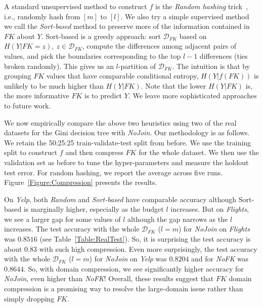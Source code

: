 \documentclass{vldb}
\begin{document}
A standard unsupervised method to construct $f$ is the \textit{Random hashing} trick~\cite{hashingtrick}, i.e., randomly hash from $[m]$ to $[l]$.
We also try a simple supervised method we call the \textit{Sort-based} method to preserve more of the information contained 
in $FK$ about $Y$. Sort-based is a greedy approach: sort $\mathcal{D}_{FK}$ based on $H(Y|FK=z), ~z \in \mathcal{D}_{FK}$, compute the 
differences among adjacent pairs of values, and pick the boundaries corresponding to the top $l-1$ differences (ties broken randomly). 
This gives us an $l$-partition of $\mathcal{D}_{FK}$. The intuition is that by grouping $FK$ values that have comparable conditional entropy, 
$H(Y|f(FK))$ is unlikely to be much higher than $H(Y|FK)$. Note that the lower $H(Y|FK)$ is, the more informative $FK$ is to predict $Y$. 
We leave more sophisticated approaches to future work.

We now empirically compare the above two heuristics using two of the real datasets for the Gini decision tree with \textit{NoJoin}. Our methodology 
is as follows. We retain the 50:25:25 train-validate-test split from before. We use the training split to construct $f$ and then compress $FK$ for 
the whole dataset. We then use the validation set as before to tune the hyper-parameters and measure the holdout test error. For random hashing, we 
report the average across five runs. Figure~\ref{Figure:Compression} presents the results.

On \textit{Yelp}, both \textit{Random} and \textit{Sort-based} have comparable accuracy although Sort-based is marginally higher, especially
as the budget $l$ increases. But on \textit{Flights}, we see a larger gap for some values of $l$ although the gap narrows as the $l$ increases.
The test accuracy with the whole $\mathcal{D}_{FK}$ ($l=m$) for \textit{NoJoin} on \textit{Flights} was $0.8516$ (see Table~\ref{Table:RealTest}). So, 
it is surprising the test accuracy is about $0.83$ with such high compression. Even more surprisingly, the test accuracy with the whole 
$\mathcal{D}_{FK}$ ($l=m$) for \textit{NoJoin} on \textit{Yelp} was $0.8204$ and for \textit{NoFK} was $0.8644$. So, with domain compression,
we see significantly higher accuracy for \textit{NoJoin}, even higher than \textit{NoFK}! Overall, these results suggest that $FK$ domain compression 
is a promising way to resolve the large-domain issue rather than simply dropping $FK$.
\end{document}
